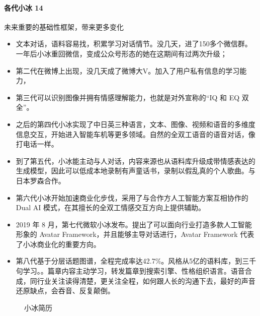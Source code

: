 \documentclass[letterpaper,10pt,english]{sphinxmanual}
\begin{document}
\paragraph{各代小冰 14\sphinxfootnotemark[1061]}
\label{\detokenize{chapter_AI_company/xiaoice:id9}}%
\begin{footnotetext}[1061]\sphinxAtStartFootnote
{}
%
\end{footnotetext}\ignorespaces 
未来重要的基础性框架，带来更多变化
\begin{itemize}
\item {} 
文本对话，语料容易找，积累学习对话情节。没几天，进了150多个微信群。一年后小冰重回微信，变成公众号形态的她在这期间有过两次升级；

\item {} 
第二代在微博上出现，没几天成了微博大V。加入了用户私有信息的学习能力，

\item {} 
第三代可以识别图像并拥有情感理解能力，也就是对外宣称的“IQ 和 EQ
双全”。

\item {} 
之后的第四代小冰实现了中日英三种语言，文本、图像、视频和语音的多维度信息交互，开始进入智能车机等更多领域。自然的全双工语音的语音对话，像打电话一样。

\item {} 
到了第五代，小冰能主动与人对话，内容来源也从语料库升级成带情感表达的生成模型，因此可以低成本地录制有声童话书，录制以假乱真的个人歌曲。与日本罗森合作。

\item {} 
第六代小冰开始加速商业化步伐，采用了与合作方人工智能方案互相协作的
Dual AI 模式，在其擅长的全双工情感交互方向上提供辅助。

\item {} 
2019 年 8
月，第七代微软小冰发布。提出了可以面向行业打造多款人工智能形象的
Avatar Framework，并且能够主导对话进行，Avatar Framework
代表了小冰商业化的重要方向。

\item {} 
第八代基于分层话题图谱，全程完成率达42.7\%。风格从5亿的语料库，到三千句学习。。篇章内容主动学习，转发篇章到搜索引擎、性格组织语言。语音合成，同行业关注读得清楚，更关注全程，如何跟人长的沟通下去，最好的声音还原缺点，会吞音、反复颠倒。

\end{itemize}

\begin{figure}[H]
\centering
\capstart

\noindent{}
\caption{小冰简历}\label{\detokenize{chapter_AI_company/xiaoice:id25}}\end{figure}
\end{document}
